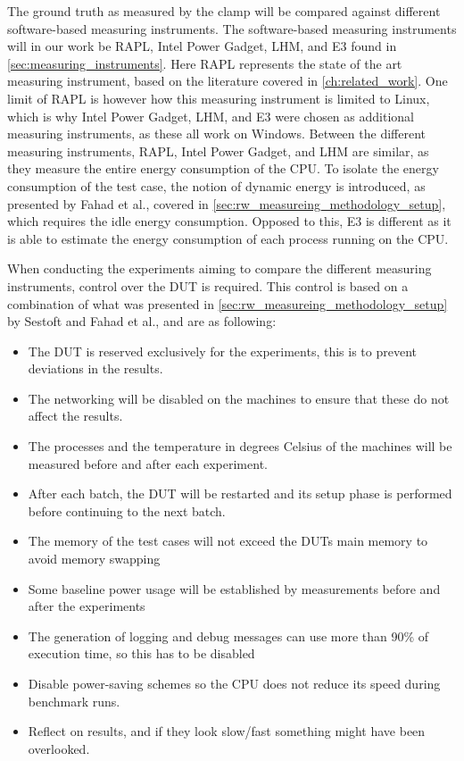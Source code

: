 The ground truth as measured by the clamp will be compared against different software-based measuring instruments. The software-based measuring instruments will in our work be RAPL, Intel Power Gadget, LHM, and E3 found in \cref{sec:measuring_instruments}. Here RAPL represents the state of the art measuring instrument, based on the literature covered in \cref{ch:related_work}. One limit of RAPL is however how this measuring instrument is limited to Linux, which is why Intel Power Gadget, LHM, and E3 were chosen as additional measuring instruments, as these all work on Windows. Between the different measuring instruments, RAPL, Intel Power Gadget, and LHM are similar, as they measure the entire energy consumption of the CPU. To isolate the energy consumption of the test case, the notion of dynamic energy is introduced, as presented by Fahad et al.\cite{fahad2019comparative}, covered in \cref{sec:rw_measureing_methodology_setup}, which requires the idle energy consumption. Opposed to this, E3 is different as it is able to estimate the energy consumption of each process running on the CPU.\newline

When conducting the experiments aiming to compare the different measuring instruments, control over the DUT is required. This control is based on a combination of what was presented in \cref{sec:rw_measureing_methodology_setup} by Sestoft\cite[]{sestoft2013microbenchmarks} and Fahad et al.\cite[]{fahad2019comparative}, and are as following:

\begin{itemize}
    \item The DUT is reserved exclusively for the experiments, this is to prevent deviations in the results.
    \item The networking will be disabled on the machines to ensure that these do not affect the results.
    \item The processes and the temperature in degrees Celsius of the machines will be measured before and after each experiment.
    \item After each batch, the DUT will be restarted and its setup phase is performed before continuing to the next batch.
    \item The memory of the test cases will not exceed the DUTs main memory to avoid memory swapping
    \item Some baseline power usage will be established by measurements before and after the experiments
    \item The generation of logging and debug messages can use more than 90\% of execution time, so this has to be disabled
    \item Disable power-saving schemes so the CPU does not reduce its speed during benchmark runs.
    \item Reflect on results, and if they look slow/fast something might have been overlooked.
\end{itemize}

